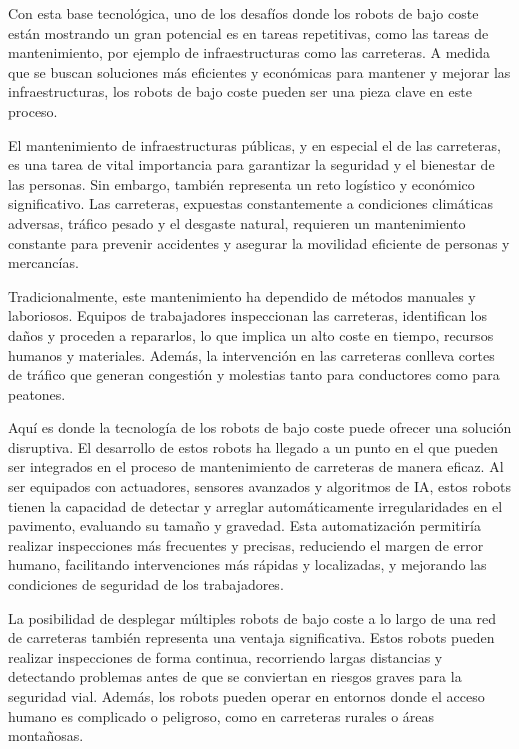 Con esta base tecnológica, uno de los desafíos donde los robots de bajo coste están mostrando un gran potencial es en tareas repetitivas, como las tareas de mantenimiento, por ejemplo de infraestructuras como las carreteras. A medida que se buscan soluciones más eficientes y económicas para mantener y mejorar las infraestructuras, los robots de bajo coste pueden ser una pieza clave en este proceso.

El mantenimiento de infraestructuras públicas, y en especial el de las carreteras, es una tarea de vital importancia para garantizar la seguridad y el bienestar de las personas. Sin embargo, también representa un reto logístico y económico significativo. Las carreteras, expuestas constantemente a condiciones climáticas adversas, tráfico pesado y el desgaste natural, requieren un mantenimiento constante para prevenir accidentes y asegurar la movilidad eficiente de personas y mercancías.

Tradicionalmente, este mantenimiento ha dependido de métodos manuales y laboriosos. Equipos de trabajadores inspeccionan las carreteras, identifican los daños y proceden a repararlos, lo que implica un alto coste en tiempo, recursos humanos y materiales. Además, la intervención en las carreteras conlleva cortes de tráfico que generan congestión y molestias tanto para conductores como para peatones.

Aquí es donde la tecnología de los robots de bajo coste puede ofrecer una solución disruptiva. El desarrollo de estos robots ha llegado a un punto en el que pueden ser integrados en el proceso de mantenimiento de carreteras de manera eficaz. Al ser equipados con actuadores, sensores avanzados y algoritmos de \ac{IA}, estos robots tienen la capacidad de detectar y arreglar automáticamente irregularidades en el pavimento, evaluando su tamaño y gravedad. Esta automatización permitiría realizar inspecciones más frecuentes y precisas, reduciendo el margen de error humano, facilitando intervenciones más rápidas y localizadas, y mejorando las condiciones de seguridad de los trabajadores.

La posibilidad de desplegar múltiples robots de bajo coste a lo largo de una red de carreteras también representa una ventaja significativa. Estos robots pueden realizar inspecciones de forma continua, recorriendo largas distancias y detectando problemas antes de que se conviertan en riesgos graves para la seguridad vial. Además, los robots pueden operar en entornos donde el acceso humano es complicado o peligroso, como en carreteras rurales o áreas montañosas.

